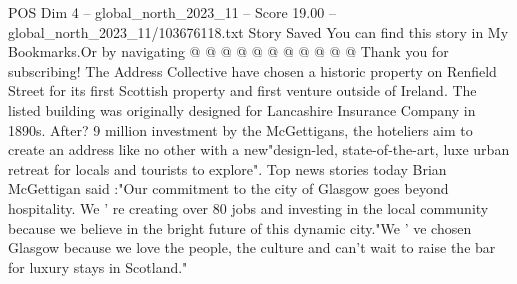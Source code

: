 \begin{textsample}{POS Dim 4 – global\_north\_2023\_11 – Score 19.00 – global\_north\_2023\_11/103676118.txt}
Story Saved You can find this story in My Bookmarks.Or by navigating @ @ @ @ @ @ @ @ @ @ @ Thank you for subscribing!
The Address Collective have chosen a historic property on Renfield Street for its first Scottish property and first venture outside of Ireland.
The listed building was originally designed for Lancashire Insurance Company in 1890s.
After? 9 million investment by the McGettigans, the hoteliers aim to create an address like no other with a new"design-led, state-of-the-art, luxe urban retreat for locals and tourists to explore".
Top news stories today Brian McGettigan said :"Our commitment to the city of Glasgow goes beyond hospitality.
We ' re creating over 80 jobs and investing in the local community because we believe in the bright future of this dynamic city."We ' ve chosen Glasgow because we love the people, the culture and can't wait to raise the bar for luxury stays in Scotland."

\end{textsample}
